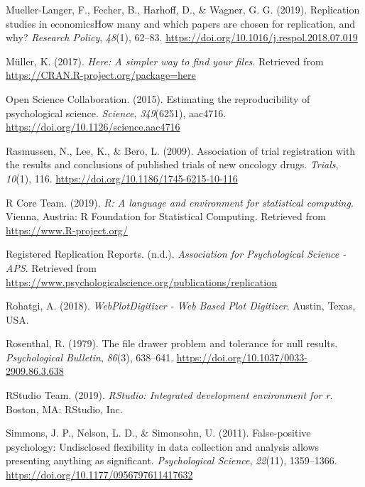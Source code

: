 \documentclass[british,,jou,floatsintext]{apa6}
\begin{document}
\leavevmode\hypertarget{ref-Mueller-Langer2019}{}%
Mueller-Langer, F., Fecher, B., Harhoff, D., \& Wagner, G. G. (2019). Replication studies in economicsHow many and which papers are chosen for replication, and why? \emph{Research Policy}, \emph{48}(1), 62--83. \url{https://doi.org/10.1016/j.respol.2018.07.019}

\leavevmode\hypertarget{ref-R-here}{}%
Müller, K. (2017). \emph{Here: A simpler way to find your files}. Retrieved from \url{https://CRAN.R-project.org/package=here}

\leavevmode\hypertarget{ref-OSC2015}{}%
Open Science Collaboration. (2015). Estimating the reproducibility of psychological science. \emph{Science}, \emph{349}(6251), aac4716. \url{https://doi.org/10.1126/science.aac4716}

\leavevmode\hypertarget{ref-Rasmussen2009}{}%
Rasmussen, N., Lee, K., \& Bero, L. (2009). Association of trial registration with the results and conclusions of published trials of new oncology drugs. \emph{Trials}, \emph{10}(1), 116. \url{https://doi.org/10.1186/1745-6215-10-116}

\leavevmode\hypertarget{ref-R-base}{}%
R Core Team. (2019). \emph{R: A language and environment for statistical computing}. Vienna, Austria: R Foundation for Statistical Computing. Retrieved from \url{https://www.R-project.org/}

\leavevmode\hypertarget{ref-RRRwebsite}{}%
Registered Replication Reports. (n.d.). \emph{Association for Psychological Science - APS}. Retrieved from \url{https://www.psychologicalscience.org/publications/replication}

\leavevmode\hypertarget{ref-Rohatgi2018}{}%
Rohatgi, A. (2018). \emph{WebPlotDigitizer - Web Based Plot Digitizer}. Austin, Texas, USA.

\leavevmode\hypertarget{ref-Rosenthal1979}{}%
Rosenthal, R. (1979). The file drawer problem and tolerance for null results. \emph{Psychological Bulletin}, \emph{86}(3), 638--641. \url{https://doi.org/10.1037/0033-2909.86.3.638}

\leavevmode\hypertarget{ref-RStudioTeam2019}{}%
RStudio Team. (2019). \emph{RStudio: Integrated development environment for r}. Boston, MA: RStudio, Inc.

\leavevmode\hypertarget{ref-Simmons2011}{}%
Simmons, J. P., Nelson, L. D., \& Simonsohn, U. (2011). False-positive psychology: Undisclosed flexibility in data collection and analysis allows presenting anything as significant. \emph{Psychological Science}, \emph{22}(11), 1359--1366. \url{https://doi.org/10.1177/0956797611417632}
\end{document}
